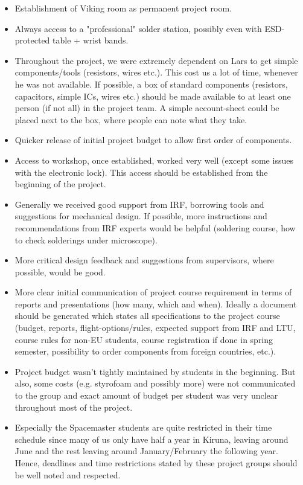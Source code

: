 \begin{itemize}
\item Establishment of Viking room as permanent project room.
\item Always access to a "professional" solder station, possibly even with ESD-protected table + wrist bands.
\item Throughout the project, we were extremely dependent on Lars to get simple components/tools (resistors, wires etc.). This cost us a lot of time, whenever he was not available. If possible, a box of standard components (resistors, capacitors, simple ICs, wires etc.) should be made available to at least one person (if not all) in the project team. A simple account-sheet could be placed next to the box, where people can note what they take.
\item Quicker release of initial project budget to allow first order of components.
\item Access to workshop, once established, worked very well (except some issues with the electronic lock). This access should be established from the beginning of the project.
\item Generally we received good support from IRF, borrowing tools and suggestions for mechanical design. If possible, more instructions and recommendations from IRF experts would be helpful (soldering course, how to check solderings under microscope).
\item More critical design feedback and suggestions from supervisors, where possible, would be good.
\item More clear initial communication of project course requirement in terms of reports and presentations (how many, which and when). Ideally a document should be generated which states all specifications to the project course (budget, reports, flight-options/rules, expected support from IRF and LTU, course rules for non-EU students, course registration if done in spring semester, possibility to order components from foreign countries, etc.).
\item Project budget wasn't tightly maintained by students in the beginning. But also, some costs (e.g. styrofoam and possibly more) were not communicated to the group and exact amount of budget per student was very unclear throughout most of the project.
\item Especially the Spacemaster students are quite restricted in their time schedule since many of us only have half a year in Kiruna, leaving around June and the rest leaving around January/February the following year. Hence, deadlines and time restrictions stated by these project groups should be well noted and respected.
\end{itemize}